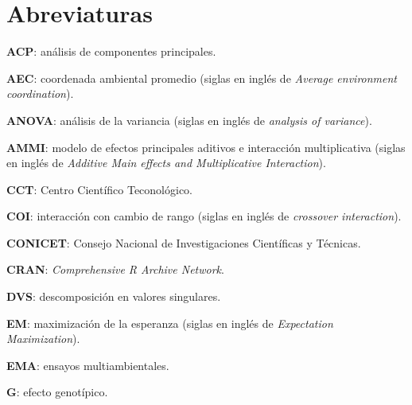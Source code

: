 

\chapter*{Abreviaturas}
\begin{spacing}{1}
\begin{description}
\item{\textbf{ACP}}: análisis de componentes principales.

\item{\textbf{AEC}}: coordenada ambiental promedio (siglas en inglés de \emph{Average environment coordination}).

\item{\textbf{ANOVA}}: análisis de la variancia (siglas en inglés de \emph{analysis of variance}).

\item{\textbf{AMMI}}: modelo de efectos principales aditivos e interacción multiplicativa (siglas en inglés de \emph{Additive Main effects and Multiplicative Interaction}).

\item{\textbf{CCT}}: Centro Científico Teconológico.

\item{\textbf{COI}}: interacción con cambio de rango (siglas en inglés de \emph{crossover interaction}).

\item{\textbf{CONICET}}: Consejo Nacional de Investigaciones Científicas y Técnicas.

\item{\textbf{CRAN}}: \emph{Comprehensive R Archive Network}.

\item{\textbf{DVS}}: descomposición en valores singulares.

\item{\textbf{EM}}: maximización de la esperanza (siglas en inglés de \emph{Expectation Maximization}).

\item{\textbf{EMA}}: ensayos multiambientales.

\item{\textbf{G}}: efecto genotípico.


\end{description}
\end{spacing}
